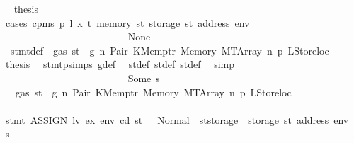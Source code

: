 \begin{isabellebody}
\ \isamarkupfalse%
\ {\isacharquery}{\kern0pt}thesis\isanewline
\ \ \ \ \ \ \ \ \ \ \ \ \ \ \ \ \ \ \ \ \ \ \isamarkupfalse%
\ {\isacharparenleft}{\kern0pt}cases\ {\isachardoublequoteopen}cpm{}s\ p\ l\ x\ t\ {\isacharparenleft}{\kern0pt}memory\ st{\isacharprime}{\kern0pt}{\isacharprime}{\kern0pt}{\isacharprime}{\kern0pt}{\isacharparenright}{\kern0pt}\ {\isacharparenleft}{\kern0pt}storage\ st{\isacharprime}{\kern0pt}{\isacharprime}{\kern0pt}\ {\isacharparenleft}{\kern0pt}address\ env{\isacharparenright}{\kern0pt}{\isacharparenright}{\kern0pt}{\isachardoublequoteclose}{\isacharparenright}{\kern0pt}\isanewline
\ \ \ \ \ \ \ \ \ \ \ \ \ \ \ \ \ \ \ \ \ \ \ \ \isamarkupfalse%
\ None\isanewline
\ \ \ \ \ \ \ \ \ \ \ \ \ \ \ \ \ \ \ \ \ \ \ \ \isamarkupfalse%
\ {}{\isacharparenleft}{\kern0pt}{}{\isacharparenright}{\kern0pt}\ stmt{\isacharunderscore}{\kern0pt}def\ {\isacharbackquoteopen}{\isasymnot}\ gas\ st\ {\isasymle}\ g{\isacharbackquoteclose}\ n\ Pair\ KMemptr\ Memory\ MTArray\ n{}\ p{}\ LStoreloc\ \isamarkupfalse%
\ {\isacharquery}{\kern0pt}thesis\ \isamarkupfalse%
\ stmt{\isachardot}{\kern0pt}psimps{\isacharparenleft}{\kern0pt}{}{\isacharparenright}{\kern0pt}\ g{\isacharunderscore}{\kern0pt}def\ \isamarkupfalse%
\ st{\isacharprime}{\kern0pt}{\isacharunderscore}{\kern0pt}def\ st{\isacharprime}{\kern0pt}{\isacharprime}{\kern0pt}{\isacharunderscore}{\kern0pt}def\ st{\isacharprime}{\kern0pt}{\isacharprime}{\kern0pt}{\isacharprime}{\kern0pt}{\isacharunderscore}{\kern0pt}def\ \isamarkupfalse%
\ simp\isanewline
\ \ \ \ \ \ \ \ \ \ \ \ \ \ \ \ \ \ \ \ \ \ \isamarkupfalse%
\isanewline
\ \ \ \ \ \ \ \ \ \ \ \ \ \ \ \ \ \ \ \ \ \ \ \ \isamarkupfalse%
\ {\isacharparenleft}{\kern0pt}Some\ s{\isacharparenright}{\kern0pt}\isanewline
\ \ \ \ \ \ \ \ \ \ \ \ \ \ \ \ \ \ \ \ \ \ \ \ \isamarkupfalse%
\ {}{\isacharparenleft}{\kern0pt}{}{\isacharparenright}{\kern0pt}\ {\isacharbackquoteopen}{\isasymnot}\ gas\ st\ {\isasymle}\ g{\isacharbackquoteclose}\ n\ Pair\ KMemptr\ Memory\ MTArray\ n{}\ p{}\ LStoreloc\isanewline
\ \ \ \ \ \ \ \ \ \ \ \ \ \ \ \ \ \ \ \ \ \ \ \ \isamarkupfalse%
\ {\isachardoublequoteopen}stmt\ {\isacharparenleft}{\kern0pt}ASSIGN\ lv\ ex{\isacharparenright}{\kern0pt}\ env\ cd\ st\ {\isacharequal}{\kern0pt}\ \ Normal\ {\isacharparenleft}{\kern0pt}{\isacharparenleft}{\kern0pt}{\isacharparenright}{\kern0pt}{\isacharcomma}{\kern0pt}\ st{\isacharprime}{\kern0pt}{\isacharprime}{\kern0pt}{\isacharprime}{\kern0pt}{\isasymlparr}storage\ {\isacharcolon}{\kern0pt}{\isacharequal}{\kern0pt}\ {\isacharparenleft}{\kern0pt}storage\ st{\isacharprime}{\kern0pt}{\isacharprime}{\kern0pt}{\isacharprime}{\kern0pt}{\isacharparenright}{\kern0pt}\ {\isacharparenleft}{\kern0pt}address\ env\ {\isacharcolon}{\kern0pt}{\isacharequal}{\kern0pt}\ s{\isacharparenright}{\kern0pt}{\isasymrparr}{\isacharparenright}{\kern0pt}{\isachardoublequoteclose}\isanewline

\end{isabellebody}
